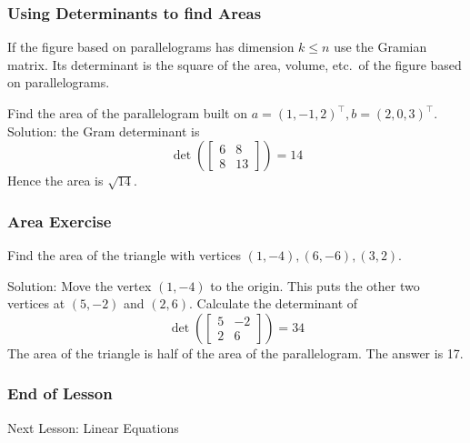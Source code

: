 \documentclass[xcolor=dvipsnames]{beamer}
\begin{document}
\begin{frame}
  \frametitle{Using Determinants to find Areas}
  If the figure based on parallelograms has dimension $k\leq{}n$ use
  the Gramian matrix. Its determinant is the square of the area,
  volume, etc.\ of the figure based on parallelograms.

\medskip

   Find the area of the parallelogram built
  on $a=(1,−1,2)^{\intercal},b=(2,0,3)^{\intercal}$. Solution: the Gram
  determinant is
  \begin{equation}
    \label{eq:ohgaiheo}
    \det\left(\left[
        \begin{array}{cc}
          6 & 8 \\
          8 & 13
        \end{array}\right]\right)=14
  \end{equation}
Hence the area is $\sqrt{14}$.
\end{frame}

\begin{frame}
  \frametitle{Area Exercise}
  {\ubung} Find the area of the triangle with vertices
  $(1,-4),(6,-6),(3,2)$.

  \medskip

  Solution: Move the vertex $(1,-4)$ to the origin. This puts the
  other two vertices at $(5,-2)$ and $(2,6)$. Calculate the
  determinant of
  \begin{equation}
    \label{eq:shuajohs}
    \det\left(\left[
      \begin{array}{cc}
        5 & -2 \\
        2 & 6
      \end{array}\right]\right)=34
  \end{equation}
The area of the triangle is half of the area of the parallelogram. The
answer is 17. 
\end{frame}

\begin{frame}
  \frametitle{End of Lesson}
Next Lesson: Linear Equations
\end{frame}
\end{document}
